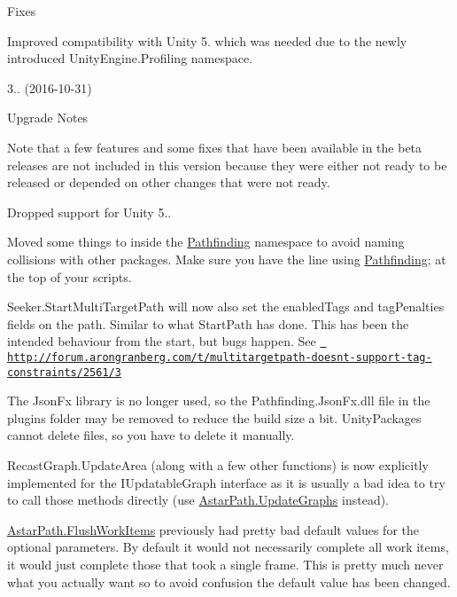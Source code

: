 \begin{DoxyItemize}
\begin{DoxyItemize}
\item Fixes
\begin{DoxyItemize}
\item Improved compatibility with Unity 5. which was needed due to the newly introduced Unity\+Engine.\+Profiling namespace.
\end{DoxyItemize}
\end{DoxyItemize}
\item 3.. (2016-\/10-\/31)
\begin{DoxyItemize}
\item Upgrade Notes
\begin{DoxyItemize}
\item Note that a few features and some fixes that have been available in the beta releases are not included in this version because they were either not ready to be released or depended on other changes that were not ready.
\item Dropped support for Unity 5..
\item Moved some things to inside the \mbox{\hyperlink{namespace_pathfinding}{Pathfinding}} namespace to avoid naming collisions with other packages. Make sure you have the line \textquotesingle{}using \mbox{\hyperlink{namespace_pathfinding}{Pathfinding}};\textquotesingle{} at the top of your scripts.
\item Seeker.\+Start\+Multi\+Target\+Path will now also set the enabled\+Tags and tag\+Penalties fields on the path. Similar to what Start\+Path has done. This has been the intended behaviour from the start, but bugs happen. See \href{http://forum.arongranberg.com/t/multitargetpath-doesnt-support-tag-constraints/2561/3}{\texttt{ http\+://forum.\+arongranberg.\+com/t/multitargetpath-\/doesnt-\/support-\/tag-\/constraints/2561/3}}
\item The Json\+Fx library is no longer used, so the Pathfinding.\+Json\+Fx.\+dll file in the plugins folder may be removed to reduce the build size a bit. Unity\+Packages cannot delete files, so you have to delete it manually.
\item Recast\+Graph.\+Update\+Area (along with a few other functions) is now explicitly implemented for the I\+Updatable\+Graph interface as it is usually a bad idea to try to call those methods directly (use \mbox{\hyperlink{class_astar_path_a6d6ca9490291366e24cde5ef10d23c30}{Astar\+Path.\+Update\+Graphs}} instead).
\item \mbox{\hyperlink{class_astar_path_a021f7aac9a2d2f76d4be29eea0c7c32e}{Astar\+Path.\+Flush\+Work\+Items}} previously had pretty bad default values for the optional parameters. By default it would not necessarily complete all work items, it would just complete those that took a single frame. This is pretty much never what you actually want so to avoid confusion the default value has been changed.

\end{DoxyItemize}
\end{DoxyItemize}
\end{DoxyItemize}
